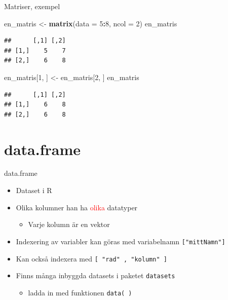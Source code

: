 \documentclass[
  11pt,
  ignorenonframetext,
]{beamer}
\newenvironment{Shaded}{\begin{snugshade}}{\end{snugshade}}
\newcommand{\DataTypeTok}[1]{\textcolor[rgb]{0.13,0.29,0.53}{#1}}
\newcommand{\DecValTok}[1]{\textcolor[rgb]{0.00,0.00,0.81}{#1}}
\newcommand{\KeywordTok}[1]{\textcolor[rgb]{0.13,0.29,0.53}{\textbf{#1}}}
\newcommand{\NormalTok}[1]{#1}
\newcommand{\OperatorTok}[1]{\textcolor[rgb]{0.81,0.36,0.00}{\textbf{#1}}}
\newcommand{\StringTok}[1]{\textcolor[rgb]{0.31,0.60,0.02}{#1}}
\providecommand{\tightlist}{%
  \setlength{\itemsep}{0pt}\setlength{\parskip}{0pt}}
\begin{document}

\begin{frame}[fragile]{Matriser, exempel}
\protect\hypertarget{matriser-exempel}{}
\begin{Shaded}
\begin{Highlighting}[]
\NormalTok{en\_matris \textless{}{-}}\StringTok{ }\KeywordTok{matrix}\NormalTok{(}\DataTypeTok{data =} \DecValTok{5}\OperatorTok{:}\DecValTok{8}\NormalTok{, }\DataTypeTok{ncol =} \DecValTok{2}\NormalTok{)}
\NormalTok{en\_matris}
\end{Highlighting}
\end{Shaded}

\begin{verbatim}
##      [,1] [,2]
## [1,]    5    7
## [2,]    6    8
\end{verbatim}

\pause

\begin{Shaded}
\begin{Highlighting}[]
\NormalTok{en\_matris[}\DecValTok{1}\NormalTok{, ] \textless{}{-}}\StringTok{ }\NormalTok{en\_matris[}\DecValTok{2}\NormalTok{, ]}
\NormalTok{en\_matris}
\end{Highlighting}
\end{Shaded}

\begin{verbatim}
##      [,1] [,2]
## [1,]    6    8
## [2,]    6    8
\end{verbatim}
\end{frame}

\hypertarget{data.frame}{%
\section{data.frame}\label{data.frame}}


\begin{frame}{data.frame}
\protect\hypertarget{data.frame-1}{}
\begin{itemize}
\tightlist
\item
  Dataset i R
\item
  Olika kolumner han ha \textcolor{red}{olika} datatyper

  \begin{itemize}
  \tightlist
  \item
    Varje kolumn är en vektor
  \end{itemize}
\item
  Indexering av variabler kan göras med variabelnamn
  \texttt{["mittNamn"]}
\item
  Kan också indexera med \texttt{[ "rad" , "kolumn" ]}
\item
  Finns många inbyggda datasets i paketet \texttt{datasets}

  \begin{itemize}
  \tightlist
  \item
    ladda in med funktionen \texttt{data( )}
  \end{itemize}
\end{itemize}
\end{frame}
\end{document}
